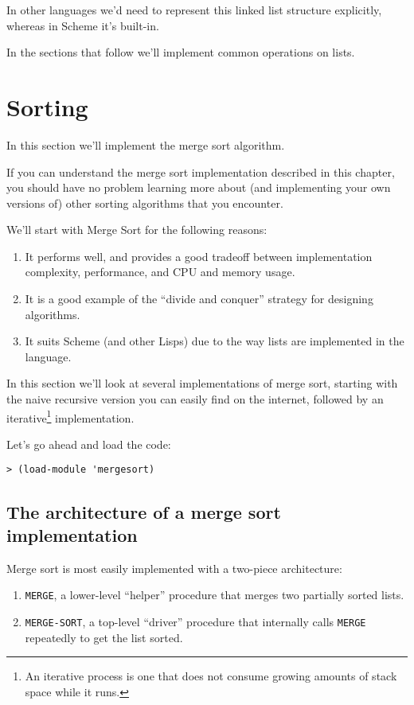 \documentclass[12pt,openright,draft]{book}
\begin{document}
In other languages we'd need to represent this linked list structure
explicitly, whereas in Scheme it's built-in.

In the sections that follow we'll implement common operations on
lists.

\section{Sorting}

In this section we'll implement the merge sort algorithm.

If you can understand the merge sort implementation described in this
chapter, you should have no problem learning more about (and
implementing your own versions of) other sorting algorithms that you
encounter.

We'll start with Merge Sort for the following reasons:

\begin{enumerate}
\item It performs well, and provides a good tradeoff between
  implementation complexity, performance, and CPU and memory usage.
\item It is a good example of the ``divide and conquer'' strategy for
  designing algorithms.
\item It suits Scheme (and other Lisps) due to the way lists are
  implemented in the language.
\end{enumerate}

In this section we'll look at several implementations of merge sort,
starting with the naive recursive version you can easily find on the
internet, followed by an iterative\footnote{An iterative process is
  one that does not consume growing amounts of stack space while it
  runs.} implementation.

Let's go ahead and load the code:

\begin{verbatim}
> (load-module 'mergesort)
\end{verbatim}

\subsection{The architecture of a merge sort implementation}

Merge sort is most easily implemented with a two-piece architecture:

\begin{enumerate}
\item \verb|MERGE|, a lower-level ``helper'' procedure that merges two
  partially sorted lists.
\item \verb|MERGE-SORT|, a top-level ``driver'' procedure that
  internally calls \verb|MERGE| repeatedly to get the list sorted.
\end{enumerate}
\end{document}
